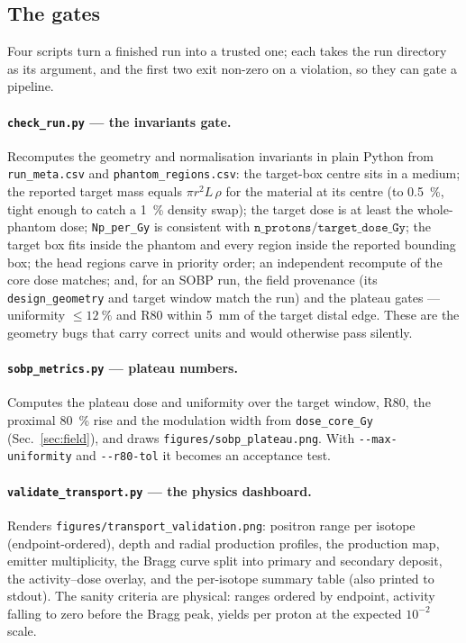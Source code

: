 \documentclass[11pt]{article}
\newcommand{\file}[1]{\texttt{#1}}
\begin{document}
\subsection{The gates}
Four scripts turn a finished run into a trusted one; each takes the run
directory as its argument, and the first two exit non-zero on a violation, so
they can gate a pipeline.

\paragraph{\file{check\_run.py} --- the invariants gate.} Recomputes the
geometry and normalisation invariants in plain Python from
\file{run\_meta.csv} and \file{phantom\_regions.csv}: the target-box centre
sits in a medium; the reported target mass equals $\pi r^2 L\,\rho$ for the
material at its centre (to \SI{0.5}{\percent}, tight enough to catch a
\SI{1}{\percent} density swap); the target dose is at least the whole-phantom
dose; \file{Np\_per\_Gy} is consistent with
$\file{n\_protons}/\file{target\_dose\_Gy}$; the target box fits inside the
phantom and every region inside the reported bounding box; the head regions
carve in priority order; an independent recompute of the core dose matches;
and, for an SOBP run, the field provenance (its \file{design\_geometry} and
target window match the run) and the plateau gates --- uniformity
$\le\SI{12}{\percent}$ and R80 within \SI{5}{mm} of the target distal edge.
These are the geometry bugs that carry correct units and would otherwise pass
silently.

\paragraph{\file{sobp\_metrics.py} --- plateau numbers.} Computes the plateau
dose and uniformity over the target window, R80, the proximal \SI{80}{\percent}
rise and the modulation width from \file{dose\_core\_Gy}
(Sec.~\ref{sec:field}), and draws \file{figures/sobp\_plateau.png}. With
\file{-{}-max-uniformity} and \file{-{}-r80-tol} it becomes an acceptance test.

\paragraph{\file{validate\_transport.py} --- the physics dashboard.} Renders
\file{figures/transport\_validation.png}: positron range per isotope
(endpoint-ordered), depth and radial production profiles, the production map,
emitter multiplicity, the Bragg curve split into primary and secondary deposit,
the activity--dose overlay, and the per-isotope summary table (also printed to
stdout). The sanity criteria are physical: ranges ordered by endpoint, activity
falling to zero before the Bragg peak, yields per proton at the expected
$10^{-2}$ scale.
\end{document}
